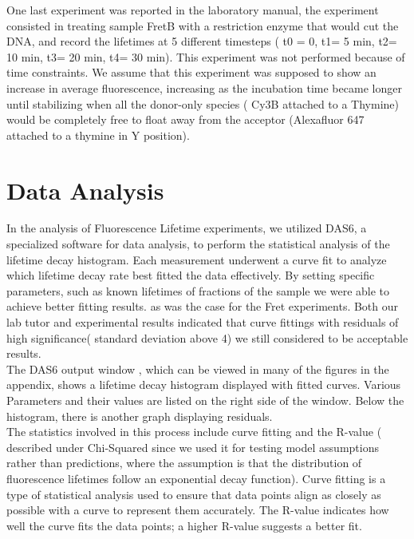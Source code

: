 \documentclass[a4paper,english,12pt,bibliography=totoc]{scrreprt}
\begin{document}
One last experiment was reported in the laboratory manual, the experiment consisted in treating sample FretB with a restriction enzyme that would cut the DNA, and record the lifetimes at 5 different timesteps ( t0 = 0, t1= 5 min, t2= 10 min, t3= 20 min, t4= 30 min).
This experiment was not performed because of time constraints.
We assume that this experiment was supposed to show an increase in average fluorescence, increasing as the incubation time became longer until stabilizing when all the donor-only species ( Cy3B attached to a Thymine) would be completely free to float away from the acceptor (Alexafluor 647 attached to a thymine in Y position).

\section{Data Analysis}
\label{sec:analysis} 

In the analysis of Fluorescence Lifetime experiments, we utilized DAS6, a specialized software for data analysis, to perform the statistical analysis of the lifetime decay histogram. Each measurement underwent a curve fit to analyze which lifetime decay rate best fitted the data effectively. By setting specific parameters, such as known lifetimes of fractions of the sample we were able to achieve better fitting results. as was the case for the Fret experiments. Both our lab tutor and experimental results indicated that curve fittings with residuals of high significance( standard deviation above 4) we still considered to be acceptable results.\\

The DAS6 output window , which can be viewed in many of the figures in the appendix, shows a lifetime decay histogram displayed with fitted curves. Various Parameters and their values are listed on the right side of the window. Below the histogram, there is another graph displaying residuals.\\

The statistics involved in this process include curve fitting and the R-value ( described under Chi-Squared since we used it for testing model assumptions rather than predictions, where the assumption is that the distribution of fluorescence lifetimes follow an exponential decay function). Curve fitting is a type of statistical analysis used to ensure that data points align as closely as possible with a curve to represent them accurately. The R-value indicates how well the curve fits the data points; a higher R-value suggests a better fit.\\
\end{document}
